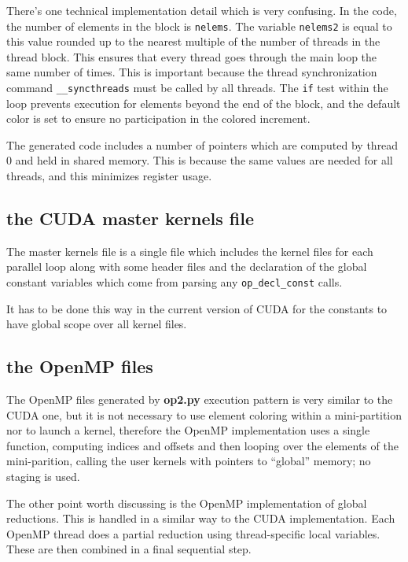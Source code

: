 \documentclass[11pt]{article}
\begin{document}
There's one technical implementation detail which is very confusing.
In the code, the number of elements in the block is {\tt nelems}.
The variable {\tt nelems2} is equal to this value rounded up to the
nearest multiple of the number of threads in the thread block.
This ensures that every thread goes through the main loop the same
number of times.  This is important because the thread synchronization
command {\tt \_\_syncthreads} must be called by all threads.
The {\tt if} test within the loop prevents execution for elements
beyond the end of the block, and the default color is set to ensure
no participation in the colored increment.

The generated code includes a number of pointers which are computed
by thread 0 and held in shared memory.  This is because the same values
are needed for all threads, and this minimizes register usage.

\subsection{the CUDA master kernels file}

The master kernels file is a single file which includes the kernel
files for each parallel loop along with some header files and the
declaration of the global constant variables which come from parsing
any {\tt op\_decl\_const} calls.

It has to be done this way in the current version of CUDA for the
constants to have global scope over all kernel files.


\subsection{the OpenMP files}

The OpenMP files generated by {\bf op2.py} execution pattern is very
similar to the CUDA one, but it is not necessary to use element coloring
within a mini-partition nor to launch a kernel, therefore the OpenMP
implementation uses a single function, computing indices and offsets
and then looping over the elements of the mini-parition, calling the user
kernels with pointers to ``global'' memory; no staging is used.

The other point worth discussing is the OpenMP implementation of
global reductions.  This is handled in a similar way to the CUDA
implementation.  Each OpenMP thread does a partial reduction using
thread-specific local variables.  These are then combined in a final
sequential step.
\end{document}
